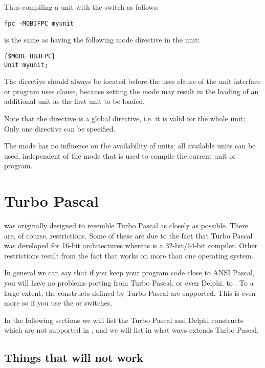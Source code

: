 Thus compiling a unit with the  switch as follows:
\begin{verbatim}
fpc -MOBJFPC myunit
\end{verbatim}
is the same as having the following mode directive in the unit:
\begin{verbatim}
{$MODE OBJFPC}
Unit myunit;
\end{verbatim}
The  directive should always be located before the uses clause of the unit
interface or program uses clause, because setting the mode may result in the
loading of an additional unit as the first unit to be loaded.

Note that the  directive is a global directive, i.e. it is
valid for the whole unit; Only one directive can be specified.

The mode has no influence on the availability of units: all available
units can be used, independent of the mode that is used to compile
the current unit or program.

\section{Turbo Pascal}
\fpc was originally designed to resemble Turbo Pascal as closely as possible.
There are, of course, restrictions. Some of these are due to the fact that
Turbo Pascal was developed  for 16-bit architectures whereas  \fpc is
a 32-bit/64-bit compiler. Other restrictions result from the fact that \fpc works
on more than one operating system.

In general we can say that if you keep your program code close to ANSI
Pascal, you will have no problems porting from Turbo Pascal, or even Delphi, to
\fpc. To a large extent, the constructs defined by Turbo Pascal are
supported. This is even more so if you use the  or 
switches.

In the following sections we will list the Turbo Pascal and Delphi
constructs which are not supported in \fpc, and we will list in what
ways \fpc extends Turbo Pascal.

\subsection{Things that will not work}

